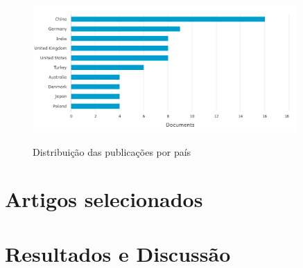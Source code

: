 \begin{figure}[H]
    \centering
    \caption{Distribuição das publicações por país}
    \includegraphics[width=0.9\textwidth]{media/docs_by_country.png}
    \label{fig:docs_by_country}
\end{figure}


\section{Artigos selecionados}
\label{section:artigos_selecionados}



\section{Resultados e Discussão}
\label{section:resultados_discussao}


